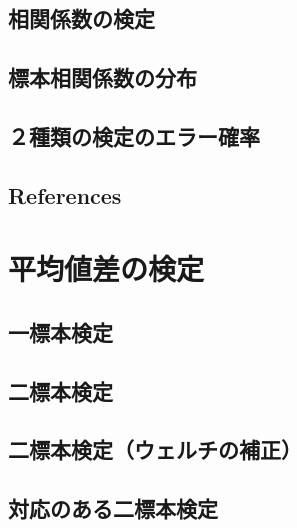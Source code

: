 \documentclass[
  a4paper,
]{ltjsbook}
\begin{document}
\section{相関係数の検定}\label{ux76f8ux95a2ux4fc2ux6570ux306eux691cux5b9a}

\section{標本相関係数の分布}\label{ux6a19ux672cux76f8ux95a2ux4fc2ux6570ux306eux5206ux5e03}

\section{２種類の検定のエラー確率}\label{ux7a2eux985eux306eux691cux5b9aux306eux30a8ux30e9ux30fcux78baux7387}

\section{References}\label{references}

\printbibliography[heading=none]


\chapter{平均値差の検定}\label{ux5e73ux5747ux5024ux5deeux306eux691cux5b9a}

\section{一標本検定}\label{ux4e00ux6a19ux672cux691cux5b9a}

\section{二標本検定}\label{ux4e8cux6a19ux672cux691cux5b9a}

\section{二標本検定（ウェルチの補正）}\label{ux4e8cux6a19ux672cux691cux5b9aux30a6ux30a7ux30ebux30c1ux306eux88dcux6b63}

\section{対応のある二標本検定}\label{ux5bfeux5fdcux306eux3042ux308bux4e8cux6a19ux672cux691cux5b9a}
\end{document}
